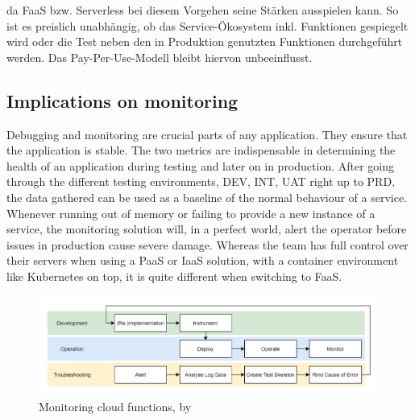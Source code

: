 \documentclass[11pt]{article}
\begin{document}
da FaaS bzw. Serverless bei diesem Vorgehen seine Stärken ausspielen kann. So ist es preislich unabhängig, ob das Service-Ökosystem inkl. Funktionen gespiegelt wird oder die Test neben den in Produktion genutzten Funktionen durchgeführt werden. Das Pay-Per-Use-Modell bleibt hiervon unbeeinflusst.    


\subsection{Implications on monitoring}
Debugging and monitoring are crucial parts of any application. They ensure that the application is stable. The two metrics are indispensable in determining the health of an application during testing and later on in production. After going through the different testing environments, DEV, INT, UAT right up to PRD, the data gathered can be used as a baseline of the normal behaviour of a service. Whenever running out of memory or failing to provide a new instance of a service, the monitoring solution will, in a perfect world, alert the operator before issues in production cause severe damage. Whereas the team has full control over their servers when using a PaaS or IaaS solution, with a container environment like Kubernetes on top, it is quite different when switching to FaaS.
\begin{figure}[H]
\caption{Monitoring cloud functions, by \cite{manner2019troubleshooting}}
\label{fig:manner}
\centering
\includegraphics[width=1\textwidth]{monitoring}
\end{figure}
\end{document}
